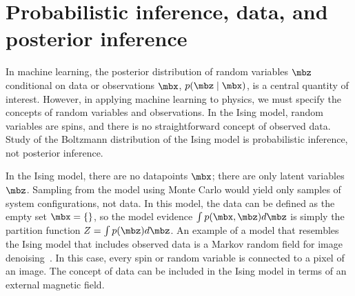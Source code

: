 
\label{sec:appendix}
\section{Probabilistic inference, data, and posterior inference}

In machine learning, the posterior distribution of random variables $\mbz$ conditional on data or observations $\mbx$, $p(\mbz \mid \mbx)$, is a central quantity of interest. However, in applying machine learning to physics, we must specify the concepts of random variables and observations. In the Ising model, random variables are spins, and there is no straightforward concept of observed data. Study of the Boltzmann distribution of the Ising model is probabilistic inference, not posterior inference.

In the Ising model, there are no datapoints $\mbx$; there are only latent variables $\mbz$. Sampling from the model using Monte Carlo would yield only samples of system configurations, not data. In this model, the data can be defined as the empty set $\mbx = \{\}$, so the model evidence $\int p(\mbx, \mbz)d\mbz$ is simply the partition function $Z = \int p(\mbz) d\mbz$. An example of a model that resembles the Ising model that includes observed data is a Markov random field for image denoising~\citep{geman1984stochastic}. In this case, every spin or random variable is connected to a pixel of an image. The concept of data can be included in the Ising model in terms of an external magnetic field.





